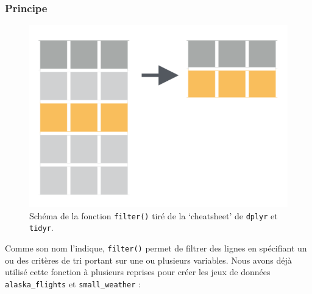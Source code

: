 \documentclass[a4paperpaper,]{article}
\newenvironment{Shaded}{\begin{snugshade}}{\end{snugshade}}
\newcommand{\DecValTok}[1]{\textcolor[rgb]{0.69,0.50,0.00}{#1}}
\newcommand{\KeywordTok}[1]{\textcolor[rgb]{0.12,0.11,0.11}{\textbf{#1}}}
\newcommand{\NormalTok}[1]{\textcolor[rgb]{0.12,0.11,0.11}{#1}}
\newcommand{\OperatorTok}[1]{\textcolor[rgb]{0.12,0.11,0.11}{#1}}
\newcommand{\StringTok}[1]{\textcolor[rgb]{0.75,0.01,0.01}{#1}}
\begin{document}
\hypertarget{principe}{%
\subsubsection{Principe}\label{principe}}

\begin{figure}[htpb]

{\centering \includegraphics[width=0.5\linewidth]{images/filter} 

}

\caption{Schéma de la fonction \texttt{filter()} tiré de la `cheatsheet' de \texttt{dplyr} et \texttt{tidyr}.}\label{fig:filterfig}
\end{figure}



Comme son nom l'indique, \texttt{filter()} permet de filtrer des lignes en spécifiant un ou des critères de tri portant sur une ou plusieurs variables. Nous avons déjà utilisé cette fonction à plusieurs reprises pour créer les jeux de données \texttt{alaska\_flights} et \texttt{small\_weather} :

\begin{Shaded}
\end{Shaded}

\begin{Shaded}
\end{Shaded}
\end{document}
